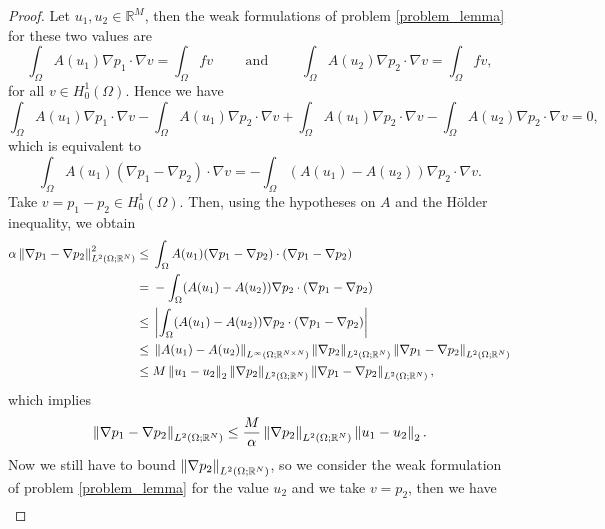 \documentclass[10pt]{article}
\begin{document}
\begin{proof}
Let $u_1, u_2 \in \mathbb{R}^M$, then the weak formulations of problem \eqref{problem_lemma} for these two values are
\begin{equation*}
\int_{\Omega} A(u_1) \nabla p_1 \cdot \nabla v = \int_{\Omega} f v \qquad \text{ and } \qquad \int_{\Omega} A(u_2) \nabla p_2 \cdot \nabla v = \int_{\Omega} f v, 
\end{equation*}
for all $v \in H^1_0(\Omega)$. Hence we have
\begin{equation*}
\int_{\Omega} A(u_1) \nabla p_1 \cdot \nabla v - \int_{\Omega} A(u_1) \nabla p_2 \cdot \nabla v + \int_{\Omega} A(u_1) \nabla p_2 \cdot \nabla v - \int_{\Omega} A(u_2) \nabla p_2 \cdot \nabla v = 0,
\end{equation*}
which is equivalent to
\begin{equation*}
\int_{\Omega} A(u_1) (\nabla p_1 - \nabla p_2) \cdot \nabla v = - \int_{\Omega} (A(u_1) - A(u_2)) \nabla p_2 \cdot \nabla v.
\end{equation*}
Take $v = p_1 - p_2 \in H^1_0(\Omega)$. Then, using the hypotheses on $A$ and the H\"older inequality, we obtain
\begin{align*}
\alpha \left\|\nabla p_1 - \nabla p_2\right\|_{L^2(\Omega; \mathbb{R}^N)}^2 \le & \; \int_{\Omega} A(u_1) (\nabla p_1 - \nabla p_2) \cdot (\nabla p_1 - \nabla p_2) \\
= & \; - \int_{\Omega} (A(u_1) - A(u_2)) \nabla p_2 \cdot (\nabla p_1 - \nabla p_2) \\
\le & \; \left | \int_{\Omega} (A(u_1) - A(u_2)) \nabla p_2 \cdot (\nabla p_1 - \nabla p_2) \right | \\
\le & \; \left\|A(u_1) - A(u_2)\right\|_{L^{\infty}(\Omega; \mathbb{R}^{N \times N})} \left\|\nabla p_2\right\|_{L^2(\Omega; \mathbb{R}^N)} \left\|\nabla p_1 - \nabla p_2\right\|_{L^2(\Omega; \mathbb{R}^N)} \\
\le & \; M \left\|u_1 - u_2\right\|_2 \left\|\nabla p_2\right\|_{L^2(\Omega; \mathbb{R}^N)} \left\|\nabla p_1 - \nabla p_2\right\|_{L^2(\Omega; \mathbb{R}^N)},
\end{align*}
which implies 
\begin{equation}
\label{intermidiate}
\left\|\nabla p_1 - \nabla p_2\right\|_{L^2(\Omega; \mathbb{R}^N)} \le \frac{M}{\alpha} \left\|\nabla p_2\right\|_{L^2(\Omega; \mathbb{R}^N)} \left\|u_1 - u_2\right\|_2.
\end{equation}
Now we still have to bound $\left\|\nabla p_2\right\|_{L^2(\Omega; \mathbb{R}^N)}$, so we consider the weak formulation of problem \eqref{problem_lemma} for the value $u_2$ and we take $v = p_2$, then we have
\begin{align*}

\end{align*}
\end{proof}
\end{document}

